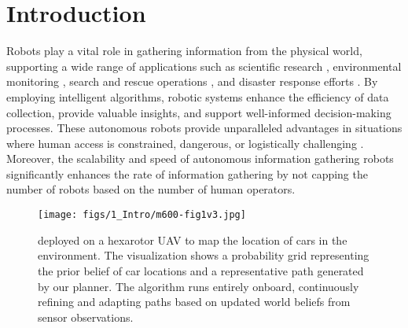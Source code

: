 \section{Introduction}



Robots play a vital role in gathering information from the physical world, supporting a wide range of applications such as scientific research \cite{doi:10.1126/scirobotics.abc3000,McCammon2021,de2021monitoring}, environmental monitoring \cite{kaufmann2021conventional, 10161136,barbedo2019review, Christensen2015,patrikar2020}, search and rescue operations \cite{Bashyam2019UAVsFW,Alsamhi2022}, and disaster response efforts \cite{bejiga2017convolutional,Mohsan2023,BAILONRUIZ2022104071}. By employing intelligent algorithms, robotic systems enhance the efficiency of data collection, provide valuable insights, and support well-informed decision-making processes. These autonomous robots provide unparalleled advantages in situations where human access is constrained, dangerous, or logistically challenging \cite{6161683}. Moreover, the scalability and speed of autonomous information gathering robots significantly enhances the rate of information gathering by not capping the number of robots based on the number of human operators. 

\begin{figure}[t]
\centering
\texttt{[image: figs/1\_Intro/m600-fig1v3.jpg]}
\caption{\PlannerNameSpaced deployed on a hexarotor UAV to map the location of cars in the environment. The visualization shows a probability grid representing the prior belief of car locations and a representative path generated by our planner. The algorithm runs entirely onboard, continuously refining and adapting paths based on updated world beliefs from sensor observations.}
\label{fig:fig1}
\end{figure}


